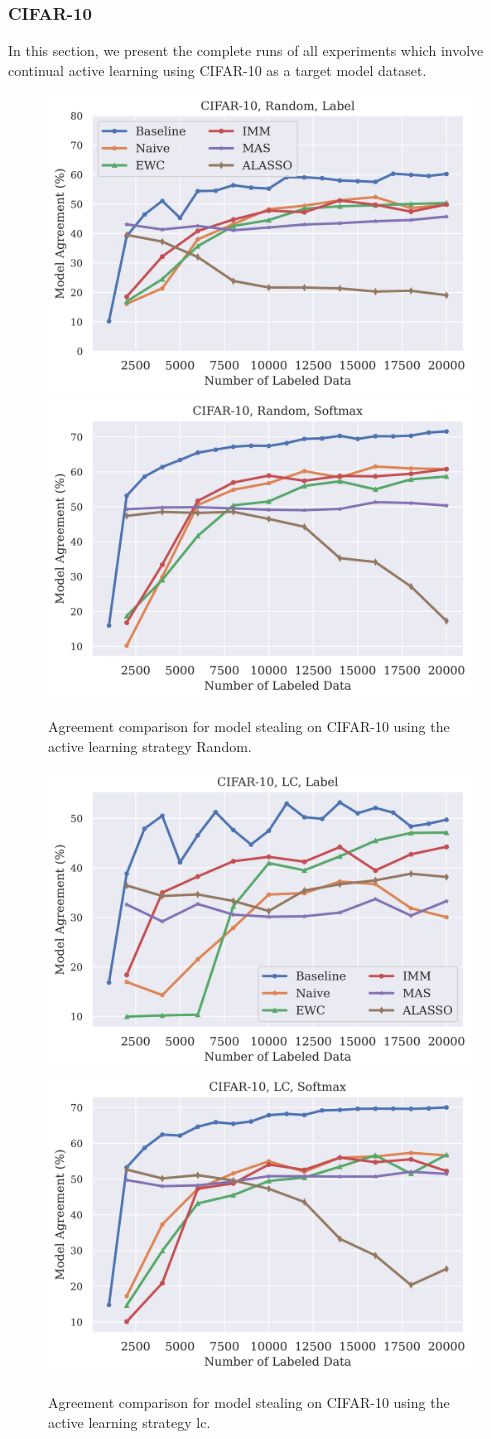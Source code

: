 \clearpage

\subsubsection{CIFAR-10}
\label{sec:Appendix:CALMS:CIFAR}
In this section, we present the complete runs of all experiments which involve continual active learning using CIFAR-10 as a target model dataset.

\begin{figure}[!htb]
    \centering
    \includegraphics[width=0.48\linewidth]{images/results_CALMS/cifar_label_random.png} \hfill
    \includegraphics[width=0.48\linewidth]{images/results_CALMS/cifar_softmax_random.png}
    \caption{Agreement comparison for model stealing on CIFAR-10 using the active learning strategy Random.}
    \label{fig:CALMSCIFAR10Random}
\end{figure}

\begin{figure}[!htb]
    \centering
    \includegraphics[width=0.48\linewidth]{images/results_CALMS/cifar_label_lc.png} \hfill
    \includegraphics[width=0.48\linewidth]{images/results_CALMS/cifar_softmax_lc.png}
    \caption{Agreement comparison for model stealing on CIFAR-10 using the active learning strategy \gls{lc}.}
    \label{fig:CALMSCIFAR10LC}
\end{figure}

